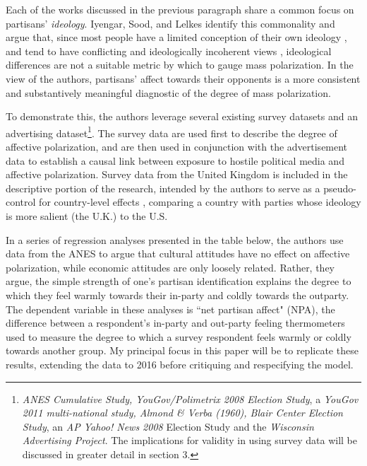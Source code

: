 \documentclass[12pt]{article}
\begin{document}
Each of the works discussed in the previous paragraph share a common focus on partisans' \textit{ideology}. Iyengar, Sood, and Lelkes identify this commonality and argue that, since most people have a limited conception of their own ideology \citep{converse1964nature}, and tend to have conflicting \citep{mcclosky1984american} and ideologically incoherent views \citep[p. 76--96]{zaller1992nature}, ideological differences are not a suitable metric by which to gauge mass polarization. In the view of the authors, partisans' affect towards their opponents is a more consistent and substantively meaningful diagnostic of the degree of mass polarization.

To demonstrate this, the authors leverage several existing survey datasets and an advertising dataset\footnote{\textit{ANES Cumulative Study, YouGov/Polimetrix 2008 Election Study}, a \textit{YouGov 2011 multi-national study, Almond \& Verba (1960), Blair Center Election Study}, an \textit{AP Yahoo! News 2008} Election Study and the \textit{Wisconsin Advertising Project}. The implications for validity in using survey data will be discussed in greater detail in section 3.}. The survey data are used first to describe the degree of affective polarization, and are then used in conjunction with the advertisement data to establish a causal link between exposure to hostile political media and affective polarization. Survey data from the United Kingdom is included in the descriptive portion of the research, intended by the authors to serve as a pseudo-control for country-level effects \citep[p. 407]{iyengar2012affect}, comparing a country with parties whose ideology is more salient (the U.K.) to the U.S.

In a series of regression analyses presented in the table below, the authors use data from the ANES to argue that cultural attitudes have no effect on affective polarization, while economic attitudes are only loosely related. Rather, they argue, the simple strength of one's partisan identification explains the degree to which they feel warmly towards their in-party and coldly towards the outparty. The dependent variable in these analyses is ``net partisan affect" (NPA), the difference between a respondent's in-party and out-party feeling thermometers used to measure the degree to which a survey respondent feels warmly or coldly towards another group. My principal focus in this paper will be to replicate these results, extending the data to 2016 before critiquing and respecifying the model.
\end{document}
